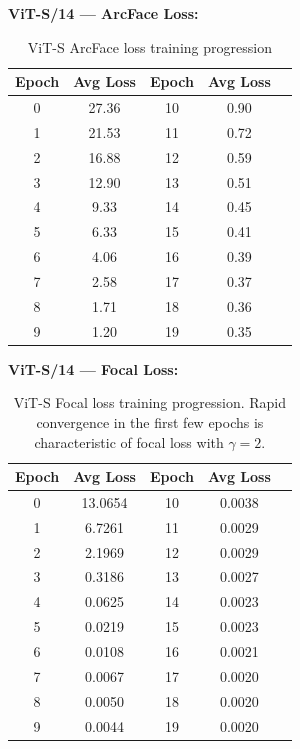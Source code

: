 \documentclass[
    english,
]{VUMIFPSbakalaurinis}
\begin{document}
\textbf{ViT-S/14 — ArcFace Loss:}
\begin{table}[H]
\centering
\small
\begin{tabular}{ccccc}
\toprule
\textbf{Epoch} & \textbf{Avg Loss} & \textbf{Epoch} & \textbf{Avg Loss} \\
\midrule
0 & 27.36 & 10 & 0.90 \\
1 & 21.53 & 11 & 0.72 \\
2 & 16.88 & 12 & 0.59 \\
3 & 12.90 & 13 & 0.51 \\
4 & 9.33  & 14 & 0.45 \\
5 & 6.33  & 15 & 0.41 \\
6 & 4.06  & 16 & 0.39 \\
7 & 2.58  & 17 & 0.37 \\
8 & 1.71  & 18 & 0.36 \\
9 & 1.20  & 19 & 0.35 \\
\bottomrule
\end{tabular}
\caption{ViT-S ArcFace loss training progression}
\end{table}

\textbf{ViT-S/14 — Focal Loss:}
\begin{table}[H]
\centering
\small
\begin{tabular}{ccccc}
\toprule
\textbf{Epoch} & \textbf{Avg Loss} & \textbf{Epoch} & \textbf{Avg Loss} \\
\midrule
0 & 13.0654 & 10 & 0.0038 \\
1 & 6.7261  & 11 & 0.0029 \\
2 & 2.1969  & 12 & 0.0029 \\
3 & 0.3186  & 13 & 0.0027 \\
4 & 0.0625  & 14 & 0.0023 \\
5 & 0.0219  & 15 & 0.0023 \\
6 & 0.0108  & 16 & 0.0021 \\
7 & 0.0067  & 17 & 0.0020 \\
8 & 0.0050  & 18 & 0.0020 \\
9 & 0.0044  & 19 & 0.0020 \\
\bottomrule
\end{tabular}
\caption{ViT-S Focal loss training progression. Rapid convergence in the first few epochs is characteristic of focal loss with $\gamma = 2$.}
\end{table}
\end{document}
